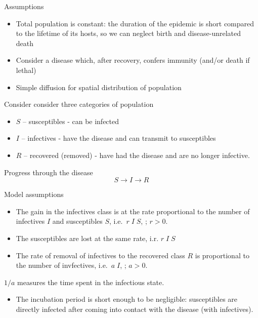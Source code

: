 \documentclass[
  letterpaper,
  DIV=11,
  numbers=noendperiod]{scrreprt}
\providecommand{\tightlist}{%
  \setlength{\itemsep}{0pt}\setlength{\parskip}{0pt}}\usepackage{longtable,booktabs,array}
\theoremstyle{plain}
\theoremstyle{definition}
\theoremstyle{plain}
\theoremstyle{remark}
\begin{document}
Assumptions

\begin{itemize}
\item
  Total population is constant: the duration of the epidemic is short
  compared to the lifetime of its hosts, so we can neglect birth and
  disease-unrelated death
\item
  Consider a disease which, after recovery, confers immunity (and/or
  death if lethal)
\item
  Simple diffusion for spatial distribution of population
\end{itemize}

Consider consider three categories of population

\begin{itemize}
\tightlist
\item
  \(S\) -- susceptibles - can be infected
\item
  \(I\) -- infectives - have the disease and can transmit to
  susceptibles
\item
  \(R\) -- recovered (removed) - have had the disease and are no longer
  infective.
\end{itemize}

Progress through the disease \[
S \longrightarrow I \longrightarrow R 
\]

Model assumptions

\begin{itemize}
\item
  The gain in the infectives class is at the rate proportional to the
  number of infectives \(I\) and susceptibles \(S\), i.e.~\(r\; I\; S\),
  ; \(r>0\).
\item
  The susceptibles are lost at the same rate, i.r. \(r\; I\; S\)
\item
  The rate of removal of infectives to the recovered class \(R\) is
  proportional to the number of invfectives, i.e.~\(a\; I\), ; \(a>0\).
\end{itemize}

\(1/a\) measures the time spent in the infectious state.

\begin{itemize}
\tightlist
\item
  The incubation period is short enough to be negligible: susceptibles
  are directly infected after coming into contact with the disease (with
  infectives).
\end{itemize}
\end{document}
